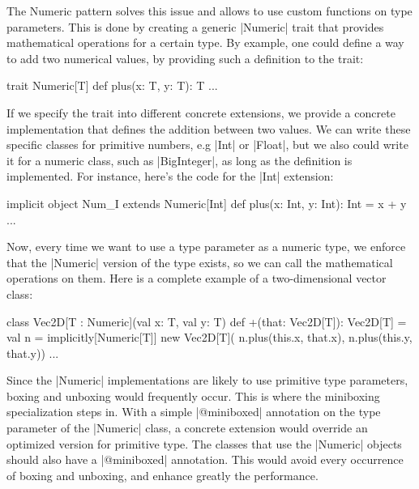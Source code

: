 The Numeric pattern solves this issue and allows to use custom functions on type parameters. This is done by creating a generic |Numeric| trait that provides mathematical operations for a certain type. By example, one could define a way to add two numerical values, by providing such a definition to the trait:

\begin{lstlisting-nobreak}
 trait Numeric[T] {
   def plus(x: T, y: T): T
   ...
 }
\end{lstlisting-nobreak}

If we specify the trait into different concrete extensions, we provide a concrete implementation that defines the addition between two values. We can write these specific classes for primitive numbers, e.g |Int| or |Float|, but we also could write it for a numeric class, such as |BigInteger|, as long as the definition is implemented. For instance, here's the code for the |Int| extension:

\begin{lstlisting-nobreak}
 implicit object Num_I extends Numeric[Int] {
   def plus(x: Int, y: Int): Int = x + y
   ...
 }
\end{lstlisting-nobreak}

Now, every time we want to use a type parameter as a numeric type, we enforce that the |Numeric| version of the type exists, so we can call the mathematical operations on them. Here is a complete example of a two-dimensional vector class:

\begin{lstlisting-nobreak}
 class Vec2D[T : Numeric](val x: T, val y: T) {
   def +(that: Vec2D[T]): Vec2D[T] = {
     val n = implicitly[Numeric[T]]
     new Vec2D[T](
       n.plus(this.x, that.x),
       n.plus(this.y, that.y))
   }
   ...
 }
\end{lstlisting-nobreak}

Since the |Numeric| implementations are likely to use primitive type parameters, boxing and unboxing would frequently occur. This is where the miniboxing specialization steps in. With a simple |@miniboxed| annotation on the type parameter of the |Numeric| class, a concrete extension would override an optimized version for primitive type. The classes that use the |Numeric| objects should also have a |@miniboxed| annotation. This would avoid every occurrence of boxing and unboxing, and enhance greatly the performance.